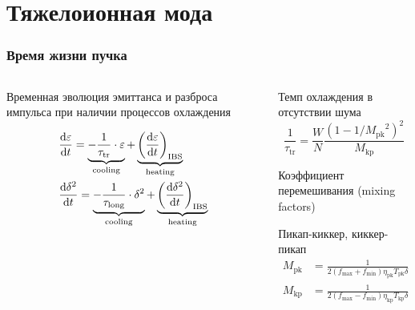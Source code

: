 \section{Тяжелоионная мода}

\begin{frame}
	\frametitle{Время жизни пучка}
	
\begin{columns}[t]
	\begin{column}{0.5\textwidth}
\par Временная эволюция эмиттанса и разброса импульса при наличии процессов охлаждения

\small \begin{equation}
\begin{aligned}
& \dv{\varepsilon}{t}=\underbrace{-\frac{1}{\tau_{\text{tr}}} \cdot \varepsilon}_{\text {cooling}}+\underbrace{\left(\dv{\varepsilon}{t}\right)_{\text{IBS}}}_{\text{heating}} \\
& \dv{\delta^2}{t}=\underbrace{-\frac{1}{\tau_{\text{long}}} \cdot \delta^2}_{\text {cooling}}+\underbrace{\left(\dv{\delta^2}{t}\right)_{\text {IBS}}}_{\text {heating}} \\
&
\end{aligned}
\end{equation} \normalsize 	
	 \end{column}
	 \begin{column}{0.5\textwidth}
	 \par Темп охлаждения в отсутствии шума
	  	\small \begin{equation}
	 	\frac{1}{\tau_{\text{tr}}}=\frac{W}{N}\frac{\left(1-1/{M_{\text{pk}}}^2\right)^2}{M_{\text{kp}}}
	 	\end{equation} \normalsize 
	\par Коэффициент перемешивания (mixing factors)
	\par Пикап-киккер, киккер-пикап
	  	\small \begin{equation}
		\begin{aligned}
		M_{\text{pk}}&=\frac{1}{2\left(f_{\text{max}}+f_{\text{min}}\right)\eta_{\text{pk}}T_{\text{pk}}\delta} \\
		M_{\text{kp}}&=\frac{1}{2\left(f_{\text{max}}-f_{\text{min}}\right)\eta_{\text{kp}}T_{\text{kp}}\delta}
		\end{aligned}
	 	\end{equation} \normalsize 
          \end{column}
\end{columns}

\end{frame}


